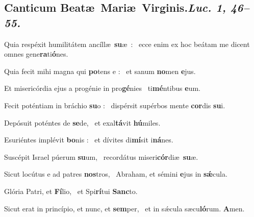 \documentclass[12pt]{article} %
\newenvironment{psalmtext}{\leftskip 0.25in}{\vspace{2 mm}}
\let\oldgresixstar\gresixstar
\renewcommand{\gresixstar}{\textcolor{benred8}{\oldgresixstar}}
\def\capitulumSpace{\hspace{20 mm}}
\begin{document}
\subsection*{}

\subsection*{Canticum Beat\ae\ Mari\ae\ Virginis.\capitulumSpace \emph{Luc. 1, 46--55.}}


\gresetfirstlineaboveinitial{\small \textsc{ \textbf{\textcolor{benred8}{V a}}}}{\small \textsc{ \textbf{\textcolor{benred8}{V a}}}}

\begin{psalmtext}
Quia resp\'{e}xit humilit\'{a}tem anc\'{i}ll\ae\ \textbf{su}\ae\ : \gresixstar\ ecce enim ex hoc be\'{a}tam me dicent omnes gene\textbf{ra}ti\textbf{\'{o}}nes.

Quia fecit mihi magna qui \textbf{po}tens e : \gresixstar\ et sanum \textbf{no}men \textbf{e}jus.

Et miseric\'{o}rdia ejus a prog\'{e}nie in pro\textbf{g\'{e}}nies \gresixstar\ ti\textbf{m\'{e}}ntibus \textbf{e}um.

Fecit pot\'{e}ntiam in br\'{a}chio \textbf{su}o : \gresixstar\ disp\'{e}rsit sup\'{e}rbos mente \textbf{cor}dis \textbf{su}i.

Dep\'{o}suit pot\'{e}ntes de \textbf{se}de, \gresixstar\ et exal\textbf{t\'{a}}vit \textbf{h\'{u}}miles.

Esuri\'{e}ntes impl\'{e}vit \textbf{bo}nis : \gresixstar\ et d\'{i}vites di\textbf{m\'{i}}sit i\textbf{n\'{a}}nes.

Susc\'{e}pit Israel p\'{u}erum \textbf{su}um, \gresixstar\ record\'{a}tus miseri\textbf{c\'{o}r}di\ae\ \textbf{su}\ae.

Sicut loc\'{u}tus e ad patres \textbf{nos}tros, \gresixstar\ Abraham, et s\'{e}mini \textbf{e}jus in \textbf{s\'{\ae}}cula.

Glória Patri, et \textbf{Fí}lio, \gresixstar\ et Spi\textbf{rí}tui \textbf{Sanc}to.

Sicut erat in princípio, et nunc, et \textbf{sem}per, \gresixstar\ et in sǽcula sæcu\textbf{ló}rum. \textbf{A}men.

\end{psalmtext}
\end{document}
